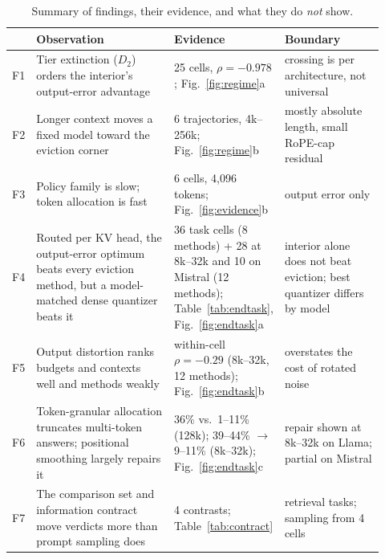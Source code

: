 \documentclass{article}
\theoremstyle{definition}
\begin{document}
\begin{table}[t]
\centering
\small
\setlength{\tabcolsep}{4pt}
\caption{Summary of findings, their evidence, and what they do \emph{not} show.}
\label{tab:findings}
\begin{tabular}{@{}p{0.03\linewidth}p{0.40\linewidth}p{0.20\linewidth}p{0.29\linewidth}@{}}
\toprule
& \textbf{Observation} & \textbf{Evidence} & \textbf{Boundary} \\
\midrule
F1 & Tier extinction ($D_2$) orders the interior's output-error advantage & 25 cells, $\rho=-0.978$; Fig.~\ref{fig:regime}a & crossing is per architecture, not universal \\
F2 & Longer context moves a fixed model toward the eviction corner & 6 trajectories, 4k--256k; Fig.~\ref{fig:regime}b & mostly absolute length, small RoPE-cap residual \\
F3 & Policy family is slow; token allocation is fast & 6 cells, 4,096 tokens; Fig.~\ref{fig:evidence}b & output error only \\
F4 & Routed per KV head, the output-error optimum beats every eviction method, but a model-matched dense quantizer beats it & 36 task cells (8 methods) + 28 at 8k--32k and 10 on Mistral (12 methods); Table~\ref{tab:endtask}, Fig.~\ref{fig:endtask}a & interior alone does not beat eviction; best quantizer differs by model \\ %
F5 & Output distortion ranks budgets and contexts well and methods weakly & within-cell $\rho=-0.29$ (8k--32k, 12 methods); Fig.~\ref{fig:endtask}b & overstates the cost of rotated noise \\ %
F6 & Token-granular allocation truncates multi-token answers; positional smoothing largely repairs it & 36\% vs.\ 1--11\% (128k); 39--44\% $\to$ 9--11\% (8k--32k); Fig.~\ref{fig:endtask}c & repair shown at 8k--32k on Llama; partial on Mistral \\ %
F7 & The comparison set and information contract move verdicts more than prompt sampling does & 4 contrasts; Table~\ref{tab:contract} & retrieval tasks; sampling from 4 cells \\ %
\bottomrule
\end{tabular}
\vspace{-2mm}
\end{table}
\end{document}

